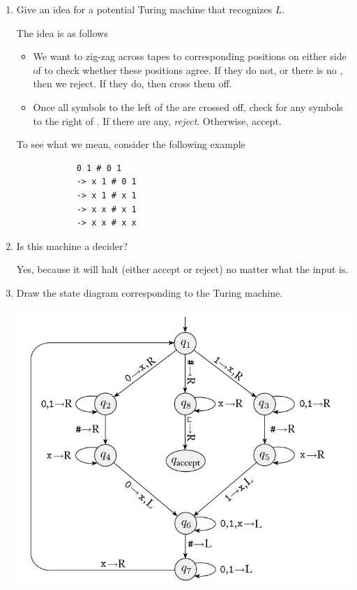 \documentclass[letterpaper]{article}
\begin{document}
\begin{enumerate}
    \item Give an idea for a potential Turing machine that recognizes $L$.

    \begin{mdframed}[]
        The idea is as follows
        \begin{itemize}
            \item We want to zig-zag across tapes to corresponding positions on either side of \code{\#} to check whether these positions agree. If they do not, or there is no \code{\#}, then we reject. If they do, then cross them off. 
            \item Once all symbols to the left of the \code{\#} are crossed off, check for any symbols to the right of \code{\#}. If there are any, \emph{reject}. Otherwise, accept.
        \end{itemize}
        To see what we mean, consider the following example  
        \begin{verbatim}
            0 1 # 0 1
            -> x 1 # 0 1
            -> x 1 # x 1 
            -> x x # x 1 
            -> x x # x x
        \end{verbatim}
    \end{mdframed}

    \item Is this machine a decider? 
    \begin{mdframed}[]
        Yes, because it will halt (either accept or reject) no matter what the input is. 
    \end{mdframed}

    \item Draw the state diagram corresponding to the Turing machine. 
    \begin{mdframed}[nobreak=true]
        \begin{center}
            \includegraphics[scale=0.7]{assets/turing_1.png}
        \end{center}


\end{mdframed}
\end{enumerate}
\end{document}
